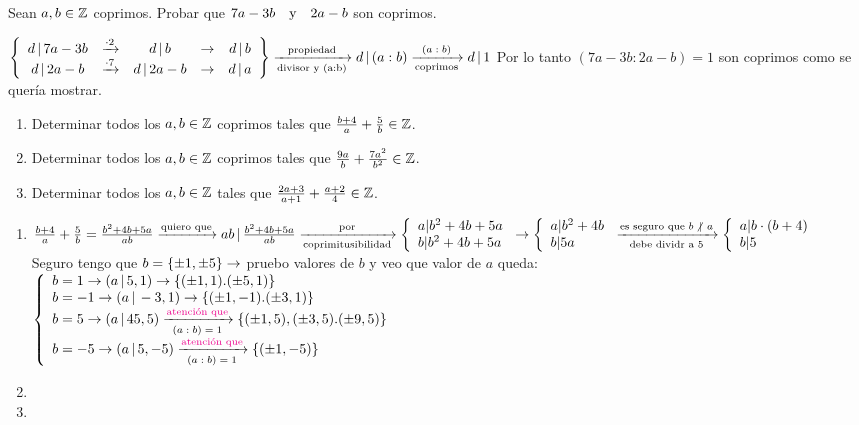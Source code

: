 \ejercicio Sean $a,b \in \mathbb Z$ coprimos. Probar que $7a - 3b \quad\text{y}\quad 2a -b$ son coprimos.

\separadorCorto

$\llaves{ccccc}{
		d \divideA 7a-3b & \flecha{$\cdot 2$} &d \divideA b  &\to&d \divideA b\\
		d \divideA 2a-b &\flecha{$\cdot 7$} & d \divideA 2a-b & \to &d \divideA a\\
	} \flecha{propiedad}[divisor y \mcd] d \divideA (a:b) \flecha{$(a:b)$}[coprimos] d \divideA 1\\
$ Por lo tanto $(7a - 3b  : 2a -b) = 1$ son coprimos como se quería mostrar.
\ejercicio
\separadorCorto

\ejercicio
\begin{enumerate}[label=\roman*)]
	\item Determinar todos los $a,b \in \mathbb Z$ coprimos tales que $\frac{b+4}{a} + \frac{5}{b} \in \mathbb Z$.
	\item Determinar todos los $a,b \in \mathbb Z$ coprimos tales que $\frac{9a}{b} + \frac{7a^2}{b^2} \in \mathbb Z$.
	\item Determinar todos los $a,b \in \mathbb Z$ tales que $\frac{2a + 3}{a + 1} + \frac{a + 2}{4} \in \mathbb Z$.
\end{enumerate}

\separadorCorto

\begin{enumerate}[label=\roman*)]
	\item
	      $\frac{b+4}{a} + \frac{5}{b} =
		      \frac{b^2 + 4b + 5a}{ab}
		      \flecha{quiero que}
		      ab \divideA \frac{b^2 + 4b + 5a}{ab}\\
		      \flecha{por}[coprimitusibilidad]
		      \llave{l}{
			      a | b^2 + 4b +5a \\
			      b | b^2 + 4b +5a \\
		      } \to
		      \llave{l}{
			      a | b^2 + 4b  \\
			      b | 5a \\
		      } \flecha{es seguro que $b\noDivide a$}[debe dividr a 5]
		      \llave{l}{
			      a | b\cdot(b+4)  \\
			      b | 5 \\
		      }
	      $\\
	      Seguro tengo que $b = \left\{ \pm1, \pm5 \right\} \to$ pruebo valores de $b$ y veo que valor de $a$ queda:\\
	      $\llave{l}{
			      b = 1 \to (a\divideA 5 ,1) \to \set{(\pm 1, 1).(\pm5,1)} \\
			      b = -1 \to (a \divideA -3,1) \to \set{(\pm 1, -1).(\pm 3,1)} \\
			      b = 5 \to (a \divideA 45,5) \flecha{\magenta{atención que}}[$(a:b) = 1$] \set{(\pm 1, 5), (\pm 3, 5).(\pm 9,5)} \\
			      b = -5 \to (a \divideA 5,-5) \flecha{\magenta{atención que}}[$(a:b) = 1$] \set{(\pm 1, -5)}
		      }$

	\item \Hacer
	\item \hacer
\end{enumerate}

